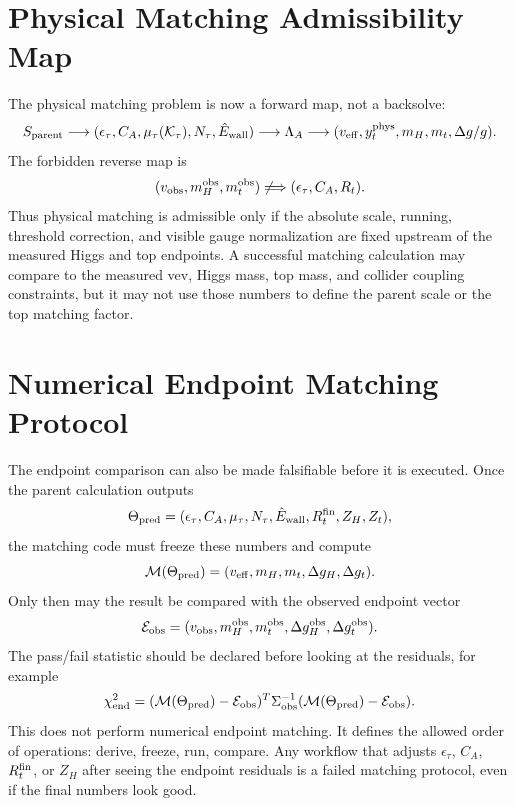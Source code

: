 \documentclass[11pt]{article}
\begin{document}
\section{Physical Matching Admissibility Map}
The physical matching problem is now a forward map, not a backsolve:
\begin{equation}
S_{\rm parent}
\longrightarrow
(\epsilon_\tau,C_A,\mu_\tau({\cal K}_\tau),N_\tau,\hat E_{\rm wall})
\longrightarrow
\Lambda_A
\longrightarrow
(v_{\rm eff},y_t^{\rm phys},m_H,m_t,\Delta g/g).
\end{equation}
The forbidden reverse map is
\begin{equation}
(v_{\rm obs},m_H^{\rm obs},m_t^{\rm obs})
\not\Longrightarrow
(\epsilon_\tau,C_A,R_t).
\end{equation}
Thus physical matching is admissible only if the absolute scale, running,
threshold correction, and visible gauge normalization are fixed upstream of
the measured Higgs and top endpoints.  A successful matching calculation may
compare to the measured vev, Higgs mass, top mass, and collider coupling
constraints, but it may not use those numbers to define the parent scale or
the top matching factor.

\section{Numerical Endpoint Matching Protocol}
The endpoint comparison can also be made falsifiable before it is executed.
Once the parent calculation outputs
\begin{equation}
\Theta_{\rm pred}
=
(\epsilon_\tau,C_A,\mu_\tau,N_\tau,\hat E_{\rm wall},
R_t^{\rm fin},Z_H,Z_t),
\end{equation}
the matching code must freeze these numbers and compute
\begin{equation}
{\cal M}(\Theta_{\rm pred})
=
(v_{\rm eff},m_H,m_t,\Delta g_H,\Delta g_t).
\end{equation}
Only then may the result be compared with the observed endpoint vector
\begin{equation}
{\cal E}_{\rm obs}
=
(v_{\rm obs},m_H^{\rm obs},m_t^{\rm obs},
\Delta g_H^{\rm obs},\Delta g_t^{\rm obs}).
\end{equation}
The pass/fail statistic should be declared before looking at the residuals,
for example
\begin{equation}
\chi_{\rm end}^2
=
({\cal M}(\Theta_{\rm pred})-{\cal E}_{\rm obs})^T
\Sigma_{\rm obs}^{-1}
({\cal M}(\Theta_{\rm pred})-{\cal E}_{\rm obs}).
\end{equation}
This does not perform numerical endpoint matching.  It defines the allowed
order of operations: derive, freeze, run, compare.  Any workflow that adjusts
$\epsilon_\tau$, $C_A$, $R_t^{\rm fin}$, or $Z_H$ after seeing the endpoint
residuals is a failed matching protocol, even if the final numbers look good.
\end{document}
